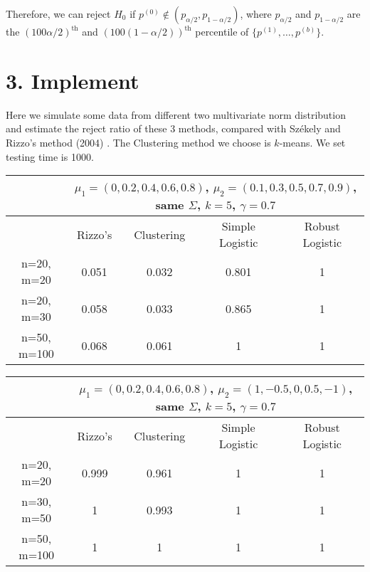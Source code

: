 \documentclass[12pt,a4paper]{article}
\begin{document}
Therefore, we can reject $H_0$ if $p^{(0)} \notin (p_{\alpha/2}, p_{1-\alpha/2})$, where $p_{\alpha/2}$ and $p_{1-\alpha/2}$ are the $(100\alpha/2)^{\text{th}}$ and $(100(1-\alpha/2))^{\text{th}}$ percentile of $\{p^{(1)},\dots ,p^{(b)}\}$.

\section*{3. Implement}
Here we simulate some data from different two multivariate norm distribution and estimate the reject ratio of these 3 methods, compared with Sz\'{e}kely and Rizzo's method (2004) \cite{szekely2004testing}. The Clustering method we choose is $k$-means. We set testing time is 1000.

\begin{center}
\begin{tabular}{|c||c|c|c|c|}
	\hline 
	& \multicolumn{4}{c|}{$\mu_1=(0,0.2,0.4,0.6,0.8)$, $\mu_2=(0.1,0.3,0.5,0.7,0.9)$, same $\Sigma$, $k=5$, $\gamma=0.7$}\\ 
	\hline 
	& Rizzo's & Clustering &Simple Logistic &Robust Logistic\\ 
	\hline 
	n=20, m=20& 0.051 &0.032 &0.801  & 1 \\ 
	\hline 
	n=20, m=30&  0.058& 0.033 &0.865&1  \\ 
	\hline 
	n=50, m=100&  0.068& 0.061 &1&1  \\ 
	\hline 
\end{tabular} 
\end{center}

\begin{center}
	\begin{tabular}{|c||c|c|c|c|}
		\hline 
		& \multicolumn{4}{c|}{$\mu_1=(0,0.2,0.4,0.6,0.8)$, $\mu_2=(1,-0.5,0,0.5,-1)$, same $\Sigma$, $k=5$, $\gamma=0.7$}\\ 
		\hline 
		& Rizzo's & Clustering &Simple Logistic &Robust Logistic\\ 
		\hline 
		n=20, m=20& 0.999 &0.961 &1  & 1 \\ 
		\hline 
		n=30, m=50&  1& 0.993 &1&1  \\ 
		\hline 
		n=50, m=100&  1& 1 &1&1  \\ 
		\hline 
	\end{tabular} 
\end{center}

\renewcommand{\refname}{4. Reference}
\lhead{}
\rhead{}


\end{document}
